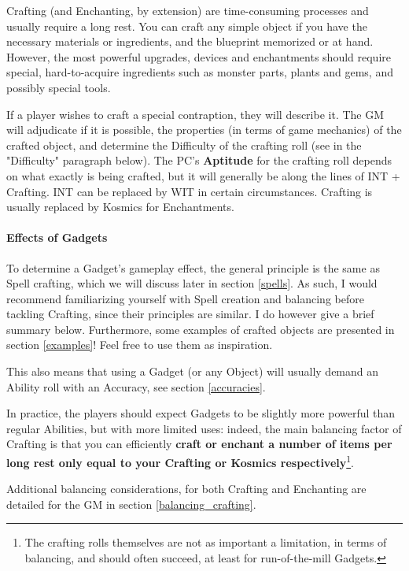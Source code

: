 Crafting (and Enchanting, by extension) are time-consuming processes and usually require a long rest. You can craft any simple object if you have the necessary materials or ingredients, and the blueprint memorized or at hand. However, the most powerful upgrades, devices and enchantments should require special, hard-to-acquire ingredients such as monster parts, plants and gems, and possibly special tools.

If a player wishes to craft a special contraption, they will describe it. The GM will adjudicate if it is possible, the properties (in terms of game mechanics) of the crafted object, and determine the Difficulty of the crafting roll (see in the "Difficulty" paragraph below). The PC's \textbf{Aptitude} for the crafting roll depends on what exactly is being crafted, but it will generally be along the lines of INT + Crafting. INT can be replaced by WIT in certain circumstances. Crafting is usually replaced by Kosmics for Enchantments.

\paragraph{Effects of Gadgets}

To determine a Gadget's gameplay effect, the general principle is the same as Spell crafting, which we will discuss later in section \ref{spells}. As such, I would recommend familiarizing yourself with Spell creation and balancing before tackling Crafting, since their principles are similar. I do however give a brief summary below. Furthermore, some examples of crafted objects are presented in section \ref{examples}! Feel free to use them as inspiration.

This also means that using a Gadget (or any Object) will usually demand an Ability roll with an Accuracy, see section \ref{accuracies}.

In practice, the players should expect Gadgets to be slightly more powerful than regular Abilities, but with more limited uses: indeed, the main balancing factor of Crafting is that you can efficiently \textbf{craft or enchant a number of items per long rest only equal to your Crafting or Kosmics respectively}\footnote{The crafting rolls themselves are not as important a limitation, in terms of balancing, and should often succeed, at least for run-of-the-mill Gadgets.}.

Additional balancing considerations, for both Crafting and Enchanting are detailed for the GM in section \ref{balancing_crafting}.


